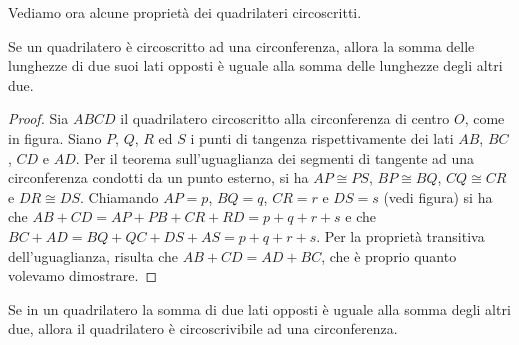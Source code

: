 Vediamo ora alcune proprietà dei quadrilateri circoscritti.

\begin{teorema}\label{teo:6.6}
Se un quadrilatero è circoscritto ad una circonferenza, allora la 
somma delle lunghezze di due suoi lati opposti è uguale alla somma 
delle lunghezze degli altri due.
\end{teorema}


\begin{inaccessibleblock}
 \begin{figure}[htb]
	\centering
\end{figure}
\end{inaccessibleblock}

\begin{proof}
Sia $ABCD$ il quadrilatero circoscritto alla circonferenza di centro 
$O$, come in figura. Siano $P$, $Q$, $R$ ed $S$ i punti di tangenza 
rispettivamente dei lati $AB$, $BC$, $CD$ e $AD$. Per il teorema 
sull'uguaglianza dei segmenti di tangente ad una circonferenza 
condotti da un punto esterno, si ha $AP\cong PS$, $BP\cong BQ$, 
$CQ\cong CR$ e $DR\cong DS$. Chiamando $AP=p$, $BQ=q$, $CR=r$ e 
$DS=s$ (vedi figura) si ha che $AB+CD = AP+PB+CR+RD = p+q+r+s$ e che 
$BC+AD = BQ+QC+DS+AS = p+q+r+s$.
Per la proprietà transitiva dell'uguaglianza, risulta che 
$AB+CD=AD+BC$, che è proprio quanto volevamo dimostrare.
\end{proof}

\begin{teorema}
Se in un quadrilatero la somma di due lati opposti è uguale alla 
somma degli altri due, allora il quadrilatero è circoscrivibile ad 
una circonferenza.
\end{teorema}


\begin{inaccessibleblock}
 \begin{figure}[htb]
	\centering
\end{figure}
\end{inaccessibleblock}

